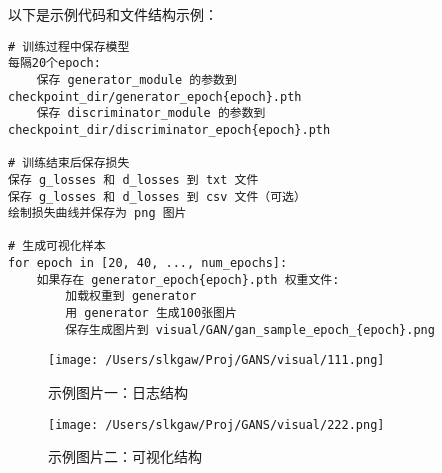 \documentclass[12pt, a4paper]{article}
\begin{document}
以下是示例代码和文件结构示例：

\begin{lstlisting}
# 训练过程中保存模型
每隔20个epoch:
    保存 generator_module 的参数到 checkpoint_dir/generator_epoch{epoch}.pth
    保存 discriminator_module 的参数到 checkpoint_dir/discriminator_epoch{epoch}.pth

# 训练结束后保存损失
保存 g_losses 和 d_losses 到 txt 文件
保存 g_losses 和 d_losses 到 csv 文件（可选）
绘制损失曲线并保存为 png 图片

# 生成可视化样本
for epoch in [20, 40, ..., num_epochs]:
    如果存在 generator_epoch{epoch}.pth 权重文件:
        加载权重到 generator
        用 generator 生成100张图片
        保存生成图片到 visual/GAN/gan_sample_epoch_{epoch}.png
\end{lstlisting}

\begin{figure}[htbp]
    \centering
    \begin{minipage}[t]{0.45\textwidth}
        \centering
        \texttt{[image: /Users/slkgaw/Proj/GANS/visual/111.png]}
        \caption{示例图片一：日志结构}
        \label{fig:img111}
    \end{minipage}
    \hspace{0.04\textwidth}
    \begin{minipage}[t]{0.45\textwidth}
        \centering
        \texttt{[image: /Users/slkgaw/Proj/GANS/visual/222.png]}
        \caption{示例图片二：可视化结构}
        \label{fig:img222}
    \end{minipage}
\end{figure}

\newpage
\end{document}
